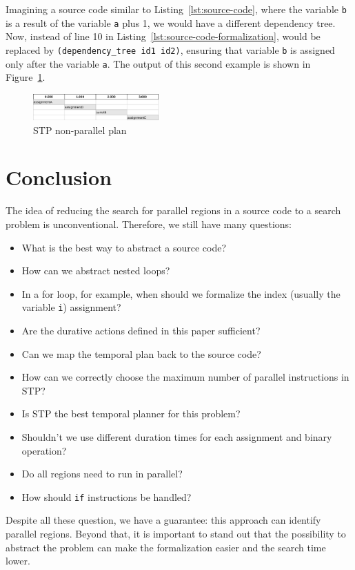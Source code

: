 \documentclass[letterpaper]{article}
\begin{document}
Imagining a source code similar to Listing~\ref{lst:source-code}, where the variable \texttt{b} is a result of the variable \texttt{a} plus 1, we would have a different dependency tree. Now, instead of line 10 in Listing~\ref{lst:source-code-formalization}, would be replaced by \texttt{(dependency\_tree\ id1\ id2)}, ensuring that variable \texttt{b} is assigned only after the variable \texttt{a}. The output of this second example is shown in Figure~\ref{fig:not-parallel-plan}.

\begin{figure}[h]
    \centering
    \includegraphics[width=0.43\textwidth]{./images/parallel-tasks-NotParallel.png}
    \caption{STP non-parallel plan}
    \label{fig:not-parallel-plan}
\end{figure}


\section{Conclusion}

The idea of reducing the search for parallel regions in a source code to a search problem is unconventional. Therefore, we still have many questions:

\begin{itemize}
    \item What is the best way to abstract a source code?
    \item How can we abstract nested loops?
    \item In a for loop, for example, when should we formalize the index (usually the variable \texttt{i}) assignment?
    \item Are the durative actions defined in this paper sufficient?
    \item Can we map the temporal plan back to the source code?
    \item How can we correctly choose the maximum number of parallel instructions in STP?
    \item Is STP the best temporal planner for this problem?
    \item Shouldn't we use different duration times for each assignment and binary operation?
    \item Do all regions need to run in parallel?
    \item How should \texttt{if} instructions be handled?
\end{itemize}

Despite all these question, we have a guarantee: this approach can identify parallel regions. Beyond that, it is important to stand out that the possibility to abstract the problem can make the formalization easier and the search time lower.




\end{document}
